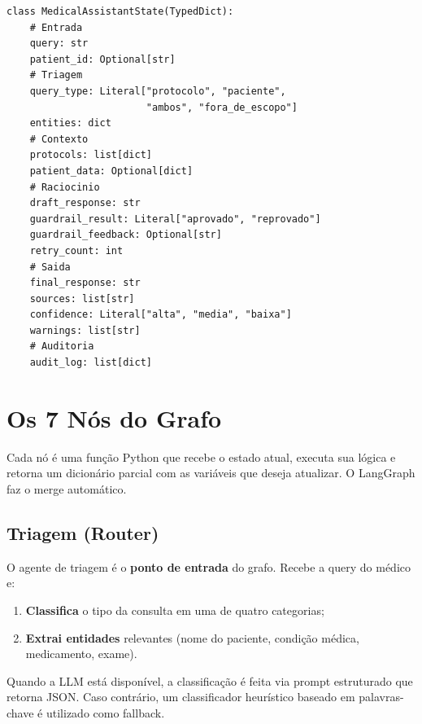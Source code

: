 \begin{lstlisting}[caption={Definição do \texttt{MedicalAssistantState} em \texttt{src/flows/state.py}.}]
class MedicalAssistantState(TypedDict):
    # Entrada
    query: str
    patient_id: Optional[str]
    # Triagem
    query_type: Literal["protocolo", "paciente",
                        "ambos", "fora_de_escopo"]
    entities: dict
    # Contexto
    protocols: list[dict]
    patient_data: Optional[dict]
    # Raciocinio
    draft_response: str
    guardrail_result: Literal["aprovado", "reprovado"]
    guardrail_feedback: Optional[str]
    retry_count: int
    # Saida
    final_response: str
    sources: list[str]
    confidence: Literal["alta", "media", "baixa"]
    warnings: list[str]
    # Auditoria
    audit_log: list[dict]
\end{lstlisting}

\section{Os 7 Nós do Grafo}\label{sec:agentes}

Cada nó é uma função Python que recebe o estado atual, executa sua lógica e retorna um dicionário parcial com as variáveis que deseja atualizar. O LangGraph faz o merge automático.

\subsection{Triagem (Router)}

O agente de triagem é o \textbf{ponto de entrada} do grafo. Recebe a query do médico e:

\begin{enumerate}
    \item \textbf{Classifica} o tipo da consulta em uma de quatro categorias;
    \item \textbf{Extrai entidades} relevantes (nome do paciente, condição médica, medicamento, exame).
\end{enumerate}

Quando a LLM está disponível, a classificação é feita via prompt estruturado que retorna JSON. Caso contrário, um classificador heurístico baseado em palavras-chave é utilizado como fallback.


